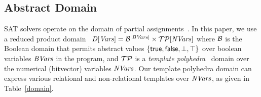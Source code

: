 %


\subsection{Abstract Domain}
SAT solvers operate on the domain of partial
assignments~\cite{sas12,dhk2013-popl}.  In this paper, we use a reduced
product domain~\cite{CC79}
$\mathit{D}[\mathit{Vars}]=\mathcal{B}^{|\mathit{BVars}|}\times\mathcal{TP}[\mathit{NVars}]$ where
$\mathcal{B}$ is the Boolean domain that permits abstract values
$\{\mathsf{true},\mathsf{false},\bot,\top\}$ over boolean variables $\mathit{BVars}$ in the
program, and $\mathcal{TP}$ is a \textit{template polyhedra}~\cite{vmcai05}
domain over the numerical (bitvector) variables $\mathit{NVars}$.  Our template
polyhedra domain can express various relational and non-relational templates
over $\mathit{NVars}$, as given in Table~\ref{domain}.
% 
